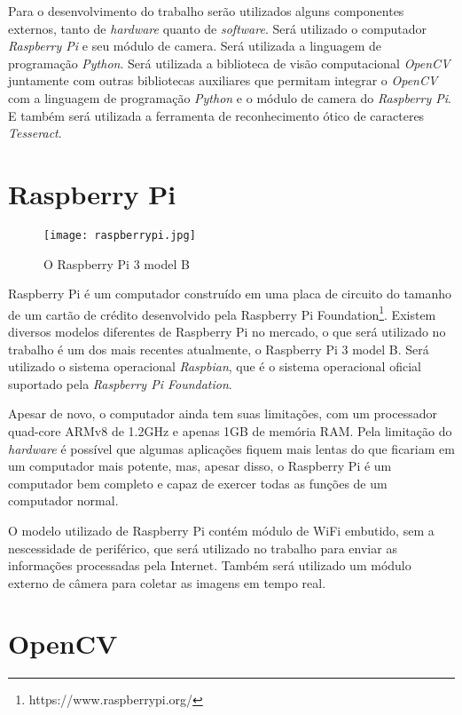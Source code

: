 Para o desenvolvimento do trabalho serão utilizados alguns componentes externos,
tanto de \emph{hardware} quanto de \emph{software}. Será utilizado o computador
\emph{Raspberry Pi} e seu módulo de camera. Será utilizada a linguagem de programação
\emph{Python}. Será utilizada a biblioteca de visão computacional \emph{OpenCV}
juntamente com outras bibliotecas auxiliares que permitam integrar o \emph{OpenCV}
com a linguagem de programação \emph{Python} e o módulo de camera do \emph{Raspberry Pi}.
E também será utilizada a ferramenta de reconhecimento ótico de caracteres \emph{Tesseract}.

\section{Raspberry Pi}
\label{sec:raspi}

\begin{figure}[H]
	\centering
	\texttt{[image: raspberrypi.jpg]}
	\caption{O Raspberry Pi 3 model B}
	\label{fig:raspberrypi}
\end{figure}

Raspberry Pi é um computador construído em uma placa de circuito do tamanho de
um cartão de crédito desenvolvido pela Raspberry Pi
Foundation\footnote{https://www.raspberrypi.org/}. Existem diversos modelos
diferentes de Raspberry Pi no mercado, o que será utilizado no trabalho é um dos
mais recentes atualmente, o Raspberry Pi 3 model B. Será utilizado o sistema
operacional \emph{Raspbian}, que é o sistema operacional oficial suportado pela
\emph{Raspberry Pi Foundation}.

Apesar de novo, o computador ainda tem suas limitações, com um processador
quad-core ARMv8 de 1.2GHz e apenas 1GB de memória RAM\@. Pela limitação do
\emph{hardware} é possível que algumas aplicações fiquem mais lentas do que
ficariam em um computador mais potente, mas, apesar disso, o Raspberry Pi é um
computador bem completo e capaz de exercer todas as funções de um computador
normal.

O modelo utilizado de Raspberry Pi contém módulo de WiFi embutido, sem a
nescessidade de periférico, que será utilizado no trabalho para enviar as
informações processadas pela Internet. Também será utilizado um módulo externo
de câmera para coletar as imagens em tempo real.

\section{OpenCV}
\label{sec:opencv}

